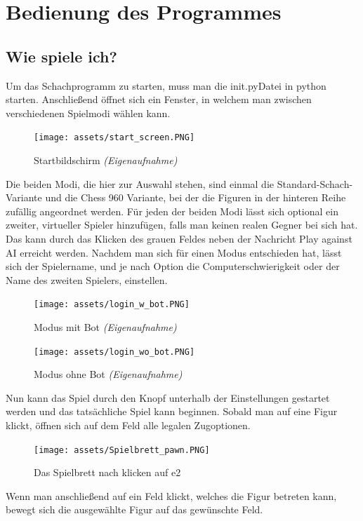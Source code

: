 \documentclass[a4paper, 10pt]{scrartcl}
\begin{document}
\section{Bedienung des Programmes}
\subsection{Wie spiele ich?}
Um das Schachprogramm zu starten, muss man die \glqq init.py\grqq  Datei in python starten. Anschließend öffnet sich ein Fenster, in welchem man zwischen verschiedenen Spielmodi
wählen kann.

\begin{figure}[h]
        \centering
        \texttt{[image: assets/start\_screen.PNG]}
        \caption{Startbildschirm \textit{(Eigenaufnahme)}}
\end{figure}
Die beiden Modi, die hier zur Auswahl stehen, sind einmal die Standard-Schach-Variante und die Chess 960 Variante,
bei der die Figuren in der hinteren Reihe zufällig angeordnet werden.
Für jeden der beiden Modi lässt sich optional ein zweiter, virtueller Spieler hinzufügen, falls man keinen realen Gegner bei sich hat.
Das kann durch das Klicken des grauen Feldes neben der Nachricht \glqq{}Play against AI \grqq erreicht werden.
Nachdem man sich für einen Modus entschieden hat, lässt sich der Spielername, und je nach Option die Computerschwierigkeit oder der Name des zweiten Spielers, einstellen.
\begin{figure}[!h]
        \centering
        \begin{minipage}[b]{.4\linewidth} %
           \texttt{[image: assets/login\_w\_bot.PNG]}
           \caption{Modus mit Bot \textit{(Eigenaufnahme)}}
        \end{minipage}
        \hspace{.1\linewidth}%
        \begin{minipage}[b]{.4\linewidth} %
           \texttt{[image: assets/login\_wo\_bot.PNG]}
           \caption{Modus ohne Bot \textit{(Eigenaufnahme)}}
        \end{minipage}
\end{figure}

Nun kann das Spiel durch den Knopf unterhalb der Einstellungen gestartet werden und das tatsächliche Spiel kann beginnen.
Sobald man auf eine Figur klickt, öffnen sich auf dem Feld alle legalen Zugoptionen.

\begin{figure}[h]
        \centering
        \texttt{[image: assets/Spielbrett\_pawn.PNG]}
        \caption{Das Spielbrett nach klicken auf e2}
\end{figure}
Wenn man anschließend auf ein Feld klickt, welches die Figur betreten kann, bewegt
sich die ausgewählte Figur auf das gewünschte Feld.
\end{document}
